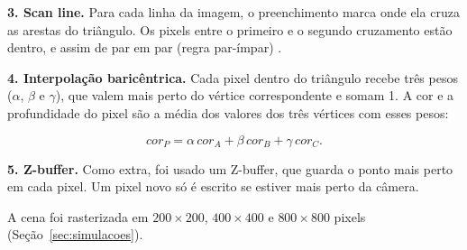 \textbf{3. Scan line.} Para cada linha da imagem, o preenchimento marca onde ela cruza as arestas do
triângulo. Os pixels entre o primeiro e o segundo cruzamento estão dentro, e assim de par em par
(regra par-ímpar) \cite{azevedo2018}.

\textbf{4. Interpolação baricêntrica.} Cada pixel dentro do triângulo recebe três pesos
($\alpha$, $\beta$ e $\gamma$), que valem mais perto do vértice correspondente e somam 1. A cor e a
profundidade do pixel são a média dos valores dos três vértices com esses pesos:

\begin{equation}
  cor_P = \alpha \, cor_A + \beta \, cor_B + \gamma \, cor_C .
\end{equation}

\textbf{5. Z-buffer.} Como extra, foi usado um Z-buffer, que guarda o ponto mais perto em cada
pixel. Um pixel novo só é escrito se estiver mais perto da câmera.

A cena foi rasterizada em $200 \times 200$, $400 \times 400$ e $800 \times 800$ pixels
(Seção~\ref{sec:simulacoes}).
